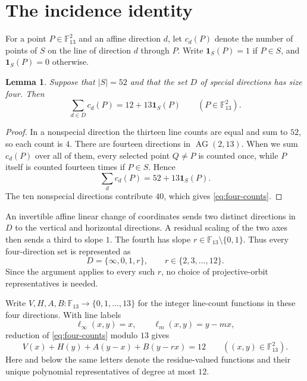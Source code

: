 \documentclass[10pt,a4paper]{amsart}
\newtheorem{lemma}[theorem]{Lemma}
\newcommand{\F}{\mathbb F}
\newcommand{\one}{\mathbf 1}
\newcommand{\AG}{\operatorname{AG}}
\begin{document}
\section{The incidence identity}\label{sec:incidence}

For a point $P\in\F_{13}^{2}$ and an affine direction $d$, let $c_d(P)$
denote the number of points of $S$ on the line of direction $d$ through $P$.
Write $\one_S(P)=1$ if $P\in S$, and $\one_S(P)=0$ otherwise.

\begin{lemma}\label{lem:incidence}
Suppose that $|S|=52$ and that the set $D$ of special directions has size
four.  Then
\begin{equation}\label{eq:four-counts}
  \sum_{d\in D}c_d(P)=12+13\one_S(P)
  \qquad(P\in\F_{13}^{2}).
\end{equation}
\end{lemma}

\begin{proof}
In a nonspecial direction the thirteen line counts are equal and sum to $52$,
so each count is $4$.  There are fourteen directions in $\AG(2,13)$.  When
we sum $c_d(P)$ over all of them, every selected point $Q\ne P$ is counted
once, while $P$ itself is counted fourteen times if $P\in S$.  Hence
\[
  \sum_d c_d(P)=52+13\one_S(P).
\]
The ten nonspecial directions contribute $40$, which gives
\eqref{eq:four-counts}.
\end{proof}

An invertible affine linear change of coordinates sends two distinct
directions in $D$ to the vertical and horizontal directions.  A residual
scaling of the two axes then sends a third to slope $1$.  The fourth has
slope $r\in\F_{13}\setminus\{0,1\}$.  Thus every four-direction set is
represented as
\[
  D=\{\infty,0,1,r\},
  \qquad r\in\{2,3,\ldots,12\}.
\]
Since the argument applies to every such $r$, no choice of projective-orbit
representatives is needed.

Write $V,H,A,B\colon\F_{13}\to\{0,1,\ldots,13\}$ for the integer line-count
functions in these four directions.  With line labels
\[
  \ell_\infty(x,y)=x,
  \qquad \ell_m(x,y)=y-mx,
\]
reduction of \eqref{eq:four-counts} modulo $13$ gives
\begin{equation}\label{eq:polynomial-identity}
  V(x)+H(y)+A(y-x)+B(y-rx)=12
  \qquad((x,y)\in\F_{13}^{2}).
\end{equation}
Here and below the same letters denote the residue-valued functions and their
unique polynomial representatives of degree at most $12$.
\end{document}
